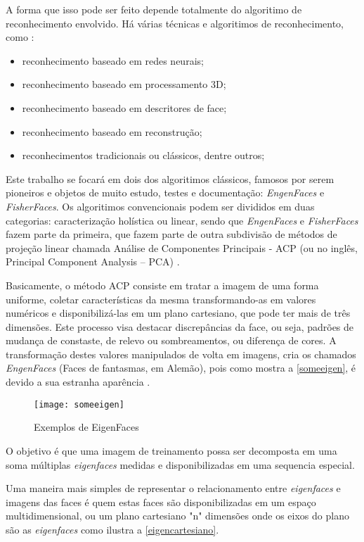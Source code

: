 A forma que isso pode ser feito depende totalmente do algoritimo de reconhecimento envolvido. Há várias técnicas e algoritimos de reconhecimento, como \cite{issues_methods_FR}:

\begin{itemize}
	\item reconhecimento baseado em redes neurais;
	\item reconhecimento baseado em processamento 3D;
	\item reconhecimento baseado em descritores de face;
	\item reconhecimento baseado em reconstrução;
	\item reconhecimentos tradicionais ou clássicos, dentre outros;
\end{itemize}

Este trabalho se focará em dois dos algoritimos clássicos, famosos por serem pioneiros e objetos de muito estudo, testes e documentação: \textit{EngenFaces} e \textit{FisherFaces}. Os algoritimos convencionais podem ser divididos em duas categorias: caracterização holística ou linear, sendo que \textit{EngenFaces} e \textit{FisherFaces} fazem parte da primeira, que fazem parte de outra subdivisão de métodos de projeção linear chamada Análise de Componentes Principais - ACP (ou no inglês, Principal Component Analysis – PCA) \cite{issues_methods_FR}.

Basicamente, o método ACP consiste em tratar a imagem de uma forma uniforme, coletar características da mesma transformando-as em valores numéricos e disponibilizá-las em um plano cartesiano, que pode ter mais de três dimensões. Este processo visa destacar discrepâncias da face, ou seja, padrões de mudança de constaste, de relevo ou sombreamentos, ou diferença de cores. A transformação destes valores manipulados de volta em imagens, cria os chamados \textit{EngenFaces} (Faces de fantasmas, em Alemão), pois como mostra a \autoref{someeigen}, é devido a sua estranha aparência \cite{drmathew_java_programming}.

\begin{figure}[h]
	\centering
	\texttt{[image: someeigen]}
	\caption{Exemplos de EigenFaces}
	\label{someeigen}
\end{figure}

O objetivo é que uma imagem de treinamento possa ser decomposta em uma soma múltiplas \textit{eigenfaces} medidas e disponibilizadas em uma sequencia especial.

Uma maneira mais simples de representar o relacionamento entre \textit{eigenfaces} e imagens das faces é quem estas faces são disponibilizadas em um espaço multidimensional, ou um plano cartesiano "n" dimensões onde os eixos do plano são as \textit{eigenfaces} \cite{drmathew_java_programming} como ilustra a  \autoref{eigencartesiano}.

